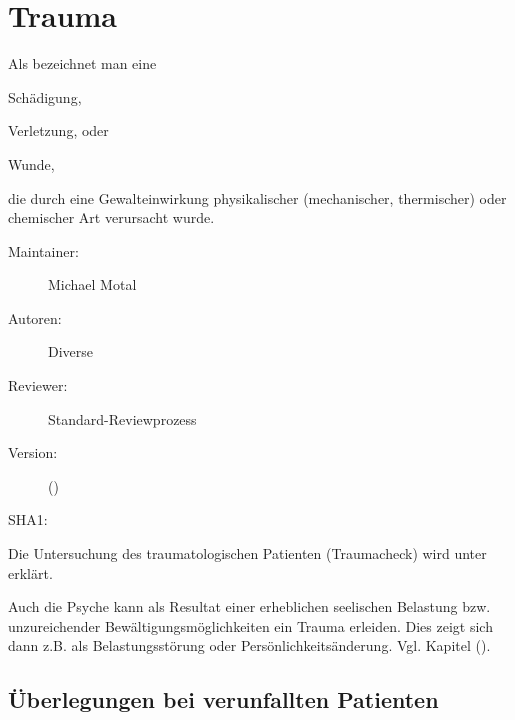 \def\ChapterCode{TRA}
% 
\chapter
[\CO{[TRA]} Trauma]
{Trauma}
\label{chp:TRA}

\ChapterIntro
{%
 Als   bezeichnet man eine
\begin{inparaenum}
  \item Schädigung,
  \item Verletzung, oder
  \item Wunde,
\end{inparaenum}
die durch eine
Gewalteinwirkung physikalischer (mechanischer,  thermischer)
oder chemischer Art verursacht wurde.
}
{%
\begin{description}
  \item[Maintainer:] Michael Motal
  \item[Autoren:] Diverse
  \item[Reviewer:] Standard-Reviewprozess
  \item[Version:] {\VarDocVersionTypeName} ({\VarDocVersionTypeDescription})
  \item[SHA1:] {\DocGitCommit}
\end{description}

{\TxTeilkapitelAASS}
}


\clearpage


Die Untersuchung des traumatologischen Patienten
(Traumacheck) wird unter 
erklärt.

Auch die Psyche kann als Resultat einer erheblichen
seelischen Belastung bzw. unzureichender
Bewältigungsmöglichkeiten ein Trauma erleiden. Dies zeigt
sich dann z.B. als Belastungsstörung oder
Persönlichkeitsänderung. Vgl. Kapitel \CO{[PSY]}
().






\section{ Überlegungen bei 
verunfallten Patienten}


